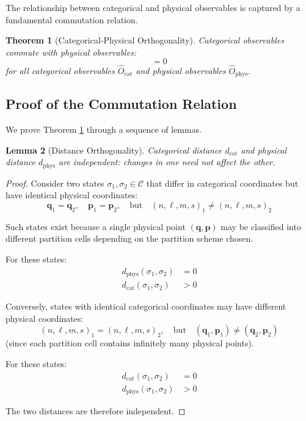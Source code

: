\documentclass[twocolumn,10pt,twoside]{article}
\newtheorem{theorem}{Theorem}[section]
\newtheorem{lemma}[theorem]{Lemma}
\newcommand{\Cat}{\mathcal{C}}
\newcommand{\Ocat}{\hat{O}_{\mathrm{cat}}}
\newcommand{\Ophys}{\hat{O}_{\mathrm{phys}}}
\newcommand{\dcat}{d_{\mathrm{cat}}}
\newcommand{\dphys}{d_{\mathrm{phys}}}
\newcommand{\partcoord}{(n,\ell,m,s)}
\begin{document}
The relationship between categorical and physical observables is captured by a fundamental commutation relation.

\begin{theorem}[Categorical-Physical Orthogonality]
\label{thm:orthogonality}
Categorical observables commute with physical observables:
\begin{equation}
[\Ocat, \Ophys] = 0
\label{eq:commutation}
\end{equation}
for all categorical observables $\Ocat$ and physical observables $\Ophys$.
\end{theorem}

\subsection{Proof of the Commutation Relation}

We prove Theorem \ref{thm:orthogonality} through a sequence of lemmas.

\begin{lemma}[Distance Orthogonality]
\label{lem:distance_orthogonality}
Categorical distance $\dcat$ and physical distance $\dphys$ are independent: changes in one need not affect the other.
\end{lemma}

\begin{proof}
Consider two states $\sigma_1, \sigma_2 \in \Cat$ that differ in categorical coordinates but have identical physical coordinates:
\begin{equation}
\mathbf{q}_1 = \mathbf{q}_2, \quad \mathbf{p}_1 = \mathbf{p}_2, \quad \text{but} \quad \partcoord_1 \neq \partcoord_2
\end{equation}

Such states exist because a single physical point $(\mathbf{q}, \mathbf{p})$ may be classified into different partition cells depending on the partition scheme chosen.

For these states:
\begin{align}
\dphys(\sigma_1, \sigma_2) &= 0 \\
\dcat(\sigma_1, \sigma_2) &> 0
\end{align}

Conversely, states with identical categorical coordinates may have different physical coordinates:
\begin{equation}
\partcoord_1 = \partcoord_2, \quad \text{but} \quad (\mathbf{q}_1, \mathbf{p}_1) \neq (\mathbf{q}_2, \mathbf{p}_2)
\end{equation}
(since each partition cell contains infinitely many physical points).

For these states:
\begin{align}
\dcat(\sigma_1, \sigma_2) &= 0 \\
\dphys(\sigma_1, \sigma_2) &> 0
\end{align}

The two distances are therefore independent.
\end{proof}
\end{document}
